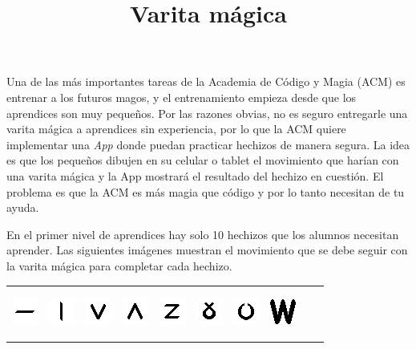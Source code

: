 \documentclass{oci}
\title{Varita mágica}
\begin{document}
\begin{problemDescription}
Una de las más importantes tareas de la 
Academia de Código y Magia (ACM) es entrenar a los futuros magos, y 
el entrenamiento empieza desde que los aprendices son muy pequeños. 
Por las razones obvias, no es seguro entregarle una varita mágica a aprendices sin experiencia,
por lo que la ACM quiere implementar una \emph{App} donde puedan practicar hechizos
de manera segura. La idea es que los pequeños dibujen en su celular o tablet 
el movimiento que harían con una varita mágica y la App mostrará el resultado del hechizo en cuestión.
El problema es que la ACM es más magia que código y por lo tanto necesitan de tu ayuda.

En el primer nivel de aprendices hay solo 10 hechizos que los alumnos necesitan aprender. 
Las siguientes imágenes muestran el movimiento que se debe seguir con la varita mágica para completar
cada hechizo.

\begin{center}
\begin{tabular}{cccccccccc}
\includegraphics{imgs/figA00.png} &
\includegraphics{imgs/figA01.png} &
\includegraphics{imgs/figA02.png} &
\includegraphics{imgs/figA03.png} &
\includegraphics{imgs/figA04.png} &
\includegraphics{imgs/figA05.png} &
\includegraphics{imgs/figA06.png} &
\begin{minipage}[b]{32pt}
\begin{center}
\includegraphics[scale=0.60]{imgs/figA07.png}\medskip


\end{center}
\end{minipage}
\end{tabular}
\end{center}
\end{problemDescription}
\end{document}

